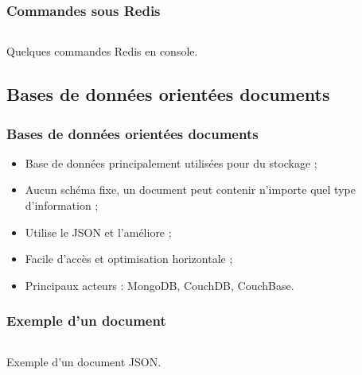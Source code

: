 	\begin{frame}
		\frametitle{Commandes sous Redis}

		\begin{listing}[H]
			\inputminted[fontsize=\tiny, linenos=true]{text}{code/commandesRedis.txt}
			\caption{Quelques commandes Redis en console.}
		\end{listing}
	\end{frame}

	\subsection{Bases de données orientées documents}
	\begin{frame}
		\frametitle{Bases de données orientées documents}

		\begin{itemize}
			\item Base de données principalement utilisées pour du stockage ;
			\item Aucun schéma fixe, un document peut contenir n'importe quel type d'information ;
			\item Utilise le JSON et l'améliore ;
			\item Facile d'accès et optimisation horizontale ;
			\item Principaux acteurs : MongoDB, CouchDB, CouchBase.
		\end{itemize}
	\end{frame}

	\begin{frame}
		\frametitle{Exemple d'un document}

		\begin{listing}[H]
			\inputminted[fontsize=\tiny, linenos=true]{json}{code/exemple-document.json}
			\caption{Exemple d'un document JSON.}
		\end{listing}
	\end{frame}


